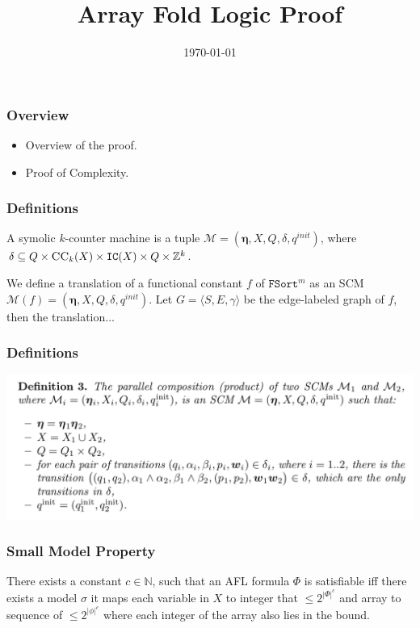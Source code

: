 \documentclass[11pt]{beamer}
\title{Array Fold Logic Proof}
\date{\today}
\begin{document}
\maketitle
\begin{frame}\frametitle{Overview }
\begin{itemize}
\item  Overview of the proof.


\item Proof of Complexity.


           
\end{itemize}
\end{frame}
\begin{frame}\frametitle{Definitions}
\begin{definition}[SMC]
A symolic $k$-counter machine is a tuple $\mathcal{M} = (\mathbf{\eta}, X, Q, \delta, q^{init})$, where 
$\delta \subseteq Q \times \textsc{CC}_k(X) \times \texttt{IC}(X) \times Q \times \mathbb{Z}^k$.

\end{definition}
\begin{definition}[Translation]
We define a translation of a functional constant $f$ of $\texttt{FSort}^m$ as an SCM $\mathcal{M}(f) = (\mathbf{\eta}, X, Q, \delta, q^{init})$. Let $G = \langle S, E, \gamma\rangle$ be the edge-labeled graph of $f$, then the translation... 
\end{definition}

\end{frame}

\begin{frame}\frametitle{Definitions}
\begin{center}
\includegraphics[scale=0.28]{para.png}
\end{center}
\end{frame}


\begin{frame}\frametitle{Small Model Property}
\begin{lemma}
There exists a constant $c\in \mathbb{N}$, such that an AFL formula $\Phi$ is satisfiable iff there exists a model $\sigma$ it maps each variable in $X$ to integer that $\le 2^{|\Phi|^c}$ and array to sequence of $\le 2^{|\phi|^c}$ where each integer of the array also lies in the bound.
\end{lemma}


\end{frame}
\end{document}
